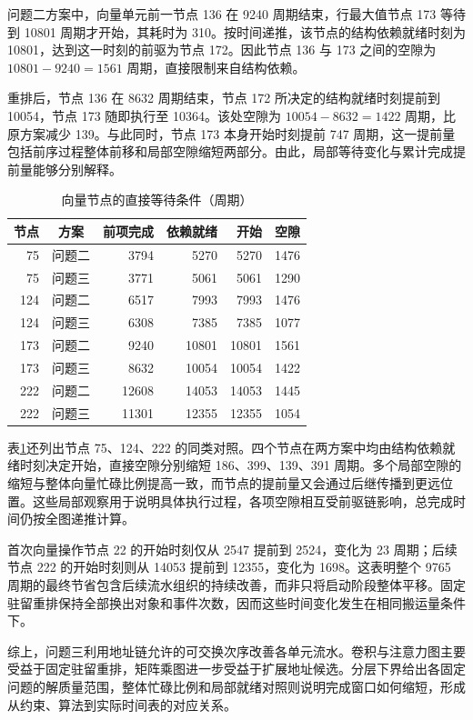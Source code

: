 问题二方案中，向量单元前一节点 136 在 9240 周期结束，行最大值节点 173 等待到 10801 周期才开始，其耗时为 310。按时间递推，该节点的结构依赖就绪时刻为 10801，达到这一时刻的前驱为节点 172。因此节点 136 与 173 之间的空隙为 $10801-9240=1561$ 周期，直接限制来自结构依赖。

重排后，节点 136 在 8632 周期结束，节点 172 所决定的结构就绪时刻提前到 10054，节点 173 随即执行至 10364。该处空隙为 $10054-8632=1422$ 周期，比原方案减少 139。与此同时，节点 173 本身开始时刻提前 747 周期，这一提前量包括前序过程整体前移和局部空隙缩短两部分。由此，局部等待变化与累计完成提前量能够分别解释。

\begin{table}[H]\centering{}
\caption{向量节点的直接等待条件（周期）}\label{tab:waits}
\begin{tabular}{rcrrrr}\toprule
节点&方案&前项完成&依赖就绪&开始&空隙\\\midrule
75&问题二&3794&5270&5270&1476\\
75&问题三&3771&5061&5061&1290\\
124&问题二&6517&7993&7993&1476\\
124&问题三&6308&7385&7385&1077\\
173&问题二&9240&10801&10801&1561\\
173&问题三&8632&10054&10054&1422\\
222&问题二&12608&14053&14053&1445\\
222&问题三&11301&12355&12355&1054\\\bottomrule
\end{tabular}\end{table}

表\ref{tab:waits}还列出节点 75、124、222 的同类对照。四个节点在两方案中均由结构依赖就绪时刻决定开始，直接空隙分别缩短 186、399、139、391 周期。多个局部空隙的缩短与整体向量忙碌比例提高一致，而节点的提前量又会通过后继传播到更远位置。这些局部观察用于说明具体执行过程，各项空隙相互受前驱链影响，总完成时间仍按全图递推计算。

首次向量操作节点 22 的开始时刻仅从 2547 提前到 2524，变化为 23 周期；后续节点 222 的开始时刻则从 14053 提前到 12355，变化为 1698。这表明整个 9765 周期的最终节省包含后续流水组织的持续改善，而非只将启动阶段整体平移。固定驻留重排保持全部换出对象和事件次数，因而这些时间变化发生在相同搬运量条件下。

综上，问题三利用地址链允许的可交换次序改善各单元流水。卷积与注意力图主要受益于固定驻留重排，矩阵乘图进一步受益于扩展地址候选。分层下界给出各固定问题的解质量范围，整体忙碌比例和局部就绪对照则说明完成窗口如何缩短，形成从约束、算法到实际时间表的对应关系。
